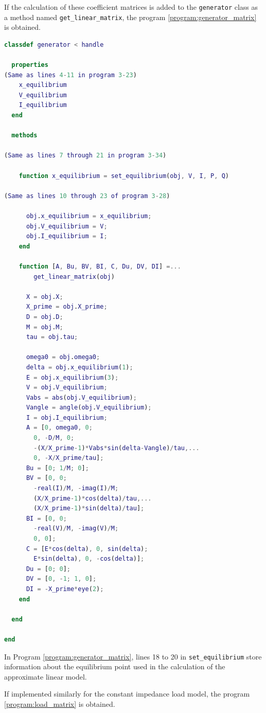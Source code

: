 \documentclass[graybox, envcountchap]{svmult}
\begin{document}
\begin{example}
If the calculation of these coefficient matrices is added to the
\verb|generator| class as a method named \verb|get_linear_matrix|, the program
\ref{program:generator_matrix} is obtained.

\smallskip
\begin{lstlisting}[language=Matlab, caption=generator.m, label={program:generator_matrix}]
classdef generator < handle
  
  properties
(Same as lines 4-11 in program 3-23)
    x_equilibrium
    V_equilibrium
    I_equilibrium
  end
  
  methods

(Same as lines 7 through 21 in program 3-34)

    function x_equilibrium = set_equilibrium(obj, V, I, P, Q)

(Same as lines 10 through 23 of program 3-28)

      obj.x_equilibrium = x_equilibrium;
      obj.V_equilibrium = V;
      obj.I_equilibrium = I;
    end
    
    function [A, Bu, BV, BI, C, Du, DV, DI] =...
        get_linear_matrix(obj)
      
      X = obj.X;
      X_prime = obj.X_prime;
      D = obj.D;
      M = obj.M;
      tau = obj.tau;
      
      omega0 = obj.omega0;
      delta = obj.x_equilibrium(1);
      E = obj.x_equilibrium(3);
      V = obj.V_equilibrium;
      Vabs = abs(obj.V_equilibrium);
      Vangle = angle(obj.V_equilibrium);
      I = obj.I_equilibrium;
      A = [0, omega0, 0;
        0, -D/M, 0;
        -(X/X_prime-1)*Vabs*sin(delta-Vangle)/tau,...
        0, -X/X_prime/tau];
      Bu = [0; 1/M; 0];
      BV = [0, 0;
        -real(I)/M, -imag(I)/M;
        (X/X_prime-1)*cos(delta)/tau,...
        (X/X_prime-1)*sin(delta)/tau];
      BI = [0, 0;
        -real(V)/M, -imag(V)/M;
        0, 0];
      C = [E*cos(delta), 0, sin(delta);
        E*sin(delta), 0, -cos(delta)];
      Du = [0; 0];
      DV = [0, -1; 1, 0];
      DI = -X_prime*eye(2);
    end

  end

end
\end{lstlisting}

In Program \ref{program:generator_matrix}, lines 18 to 20 in
\verb|set_equilibrium| store information about the equilibrium point used in the
calculation of the approximate linear model.

If implemented similarly for the constant impedance load model, the program
\ref{program:load_matrix} is obtained.


\end{example}
\end{document}
